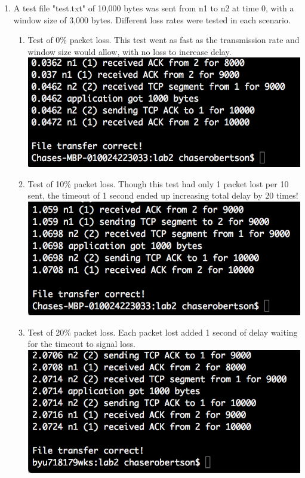 \documentclass[fleqn,11pt]{article}
\begin{document}
\begin{enumerate}

\item A test file "test.txt" of 10,000 bytes was sent from n1 to n2 at time 0, with a window size of 3,000 bytes. Different loss rates were tested in each scenario.

\begin{enumerate}
\item Test of 0\% packet loss. This test went as fast as the transmission rate and window size would allow, with no loss to increase delay. \\
\includegraphics{basic-testtxt0.png}

\item Test of 10\% packet loss. Though this test had only 1 packet lost per 10 sent, the timeout of 1 second ended up increasing total delay by 20 times! \\
\includegraphics{basic-testtxt10.png}

\item Test of 20\% packet loss. Each packet lost added 1 second of delay waiting for the timeout to signal loss. \\
\includegraphics{basic-testtxt20.png}


\end{enumerate}
\end{enumerate}
\end{document}
